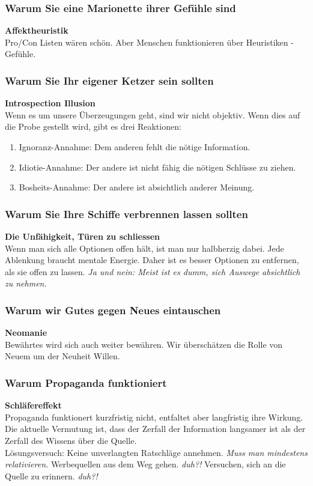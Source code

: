 \documentclass[a4paper, twocolumn]{article}
\begin{document}
\subsubsection*{Warum Sie eine Marionette ihrer Gefühle sind}
\textbf{Affektheuristik}\\
Pro/Con Listen wären schön. Aber Menschen funktionieren über Heuristiken - Gefühle.

\subsubsection*{Warum Sie Ihr eigener Ketzer sein sollten}
\textbf{Introspection Illusion}\\
Wenn es um unsere Überzeugungen geht, sind wir nicht objektiv. Wenn dies auf die Probe gestellt wird, gibt es drei Reaktionen:
\begin{enumerate}
	\item Ignoranz-Annahme: Dem anderen fehlt die nötige Information.
	\item Idiotie-Annahme: Der andere ist nicht fähig die nötigen Schlüsse zu ziehen.
	\item Bosheits-Annahme: Der andere ist absichtlich anderer Meinung.
\end{enumerate}

\subsubsection*{Warum Sie Ihre Schiffe verbrennen lassen sollten}
\textbf{Die Unfähigkeit, Türen zu schliessen}\\
Wenn man sich alle Optionen offen hält, ist man nur halbherzig dabei. Jede Ablenkung braucht mentale Energie. Daher ist es besser Optionen zu entfernen, als sie offen zu lassen.
\textit{Ja und nein: Meist ist es dumm, sich Auswege absichtlich zu nehmen.}

\subsubsection*{Warum wir Gutes gegen Neues eintauschen}
\textbf{Neomanie}\\
Bewährtes wird sich auch weiter bewähren. Wir überschätzen die Rolle von Neuem um der Neuheit Willen.

\subsubsection*{Warum Propaganda funktioniert}
\textbf{Schläfereffekt}\\
Propaganda funktionert kurzfristig nicht, entfaltet aber langfristig ihre Wirkung. Die aktuelle Vermutung ist, dass der Zerfall der Information langsamer ist als der Zerfall des Wissens über die Quelle.\\
Lösungsversuch: Keine unverlangten Ratschläge annehmen. \textit{Muss man mindestens relativieren.} Werbequellen aus dem Weg gehen. \textit{duh?!} Versuchen, sich an die Quelle zu erinnern. \textit{duh?!}
\end{document}
